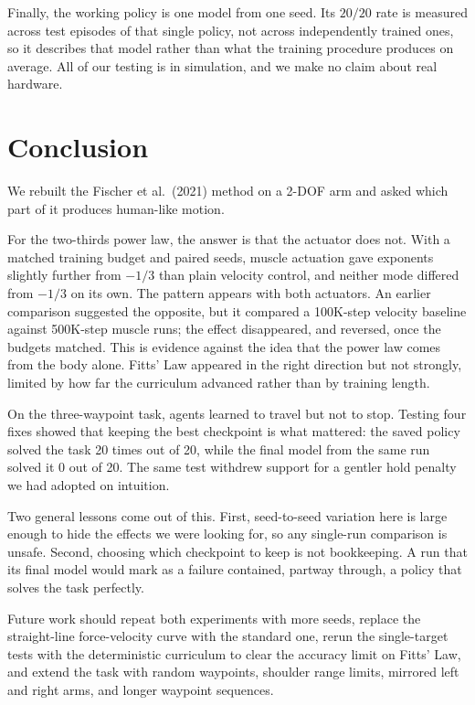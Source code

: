 \documentclass[conference]{IEEEtran}
\begin{document}
Finally, the working policy is one model from one seed. Its $20/20$ rate is
measured across test episodes of that single policy, not across independently
trained ones, so it describes that model rather than what the training
procedure produces on average. All of our testing is in simulation, and we make
no claim about real hardware.

\section{Conclusion}

We rebuilt the Fischer et al.\ (2021) method on a 2-DOF arm and asked which
part of it produces human-like motion.

For the two-thirds power law, the answer is that the actuator does not. With a
matched training budget and paired seeds, muscle actuation gave exponents
slightly further from $-1/3$ than plain velocity control, and neither mode
differed from $-1/3$ on its own. The pattern appears with both actuators. An
earlier comparison suggested the opposite, but it compared a 100K-step velocity
baseline against 500K-step muscle runs; the effect disappeared, and reversed,
once the budgets matched. This is evidence against the idea that the power law
comes from the body alone. Fitts' Law appeared in the right direction but not
strongly, limited by how far the curriculum advanced rather than by training
length.

On the three-waypoint task, agents learned to travel but not to stop. Testing
four fixes showed that keeping the best checkpoint is what mattered: the saved
policy solved the task 20 times out of 20, while the final model from the same
run solved it 0 out of 20. The same test withdrew support for a gentler hold
penalty we had adopted on intuition.

Two general lessons come out of this. First, seed-to-seed variation here is
large enough to hide the effects we were looking for, so any single-run
comparison is unsafe. Second, choosing which checkpoint to keep is not
bookkeeping. A run that its final model would mark as a failure contained,
partway through, a policy that solves the task perfectly.

Future work should repeat both experiments with more seeds, replace the
straight-line force-velocity curve with the standard one, rerun the
single-target tests with the deterministic curriculum to clear the accuracy
limit on Fitts' Law, and extend the task with random waypoints, shoulder range
limits, mirrored left and right arms, and longer waypoint sequences.
\end{document}
